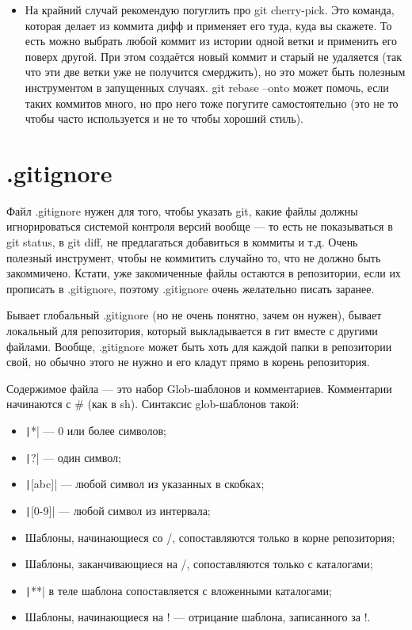 \documentclass[a5paper]{article}
\begin{document}
\begin{itemize}
	\item На крайний случай рекомендую погуглить про git cherry-pick. Это команда, которая делает из коммита дифф и применяет его туда, куда вы скажете. То есть можно выбрать любой коммит из истории одной ветки и применить его поверх другой. При этом создаётся новый коммит и старый не удаляется (так что эти две ветки уже не получится смерджить), но это может быть полезным инструментом в запущенных случаях. git rebase --onto может помочь, если таких коммитов много, но про него тоже погугите самостоятельно (это не то чтобы часто используется и не то чтобы хороший стиль).
\end{itemize}

\section{.gitignore}

Файл .gitignore нужен для того, чтобы указать git, какие файлы должны игнорироваться системой контроля версий вообще --- то есть не показываться в git status, в git diff, не предлагаться добавиться в коммиты и т.д. Очень полезный инструмент, чтобы не коммитить случайно то, что не должно быть закоммичено. Кстати, уже закомиченные файлы остаются в репозитории, если их прописать в .gitignore, поэтому .gitignore очень желательно писать заранее. 

Бывает глобальный .gitignore (но не очень понятно, зачем он нужен), бывает локальный для репозитория, который выкладывается в гит вместе с другими файлами. Вообще, .gitignore может быть хоть для каждой папки в репозитории свой, но обычно этого не нужно и его кладут прямо в корень репозитория.

Содержимое файла --- это набор Glob-шаблонов и комментариев. Комментарии начинаются с \# (как в sh). Синтаксис glob-шаблонов такой:

\begin{itemize}
	\item \texttt|*| --- 0 или более символов;
	\item \texttt|?| --- один символ;
	\item \texttt|[abc]| --- любой символ из указанных в скобках;
	\item \texttt|[0-9]| --- любой символ из интервала;
	\item Шаблоны, начинающиеся со /, сопоставляются только в корне репозитория;
	\item Шаблоны, заканчивающиеся на /, сопоставляются только с каталогами;
	\item \texttt|**| в теле шаблона сопоставляется с вложенными каталогами;
	\item Шаблоны, начинающиеся на ! --- отрицание шаблона, записанного за !.
\end{itemize}
\end{document}
